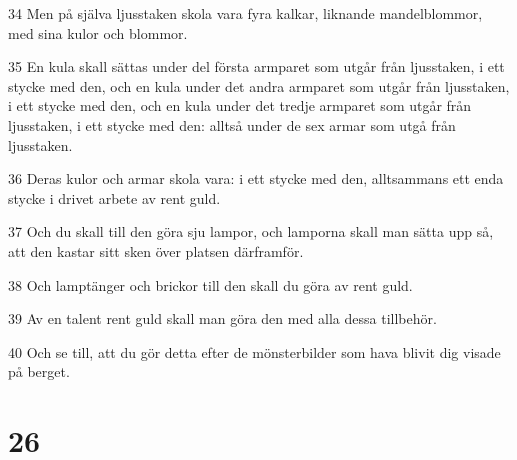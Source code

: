 \par 34 Men på själva ljusstaken skola vara fyra kalkar, liknande mandelblommor, med sina kulor och blommor.
\par 35 En kula skall sättas under del första armparet som utgår från ljusstaken, i ett stycke med den, och en kula under det andra armparet som utgår från ljusstaken, i ett stycke med den, och en kula under det tredje armparet som utgår från ljusstaken, i ett stycke med den: alltså under de sex armar som utgå från ljusstaken.
\par 36 Deras kulor och armar skola vara: i ett stycke med den, alltsammans ett enda stycke i drivet arbete av rent guld.
\par 37 Och du skall till den göra sju lampor, och lamporna skall man sätta upp så, att den kastar sitt sken över platsen därframför.
\par 38 Och lamptänger och brickor till den skall du göra av rent guld.
\par 39 Av en talent rent guld skall man göra den med alla dessa tillbehör.
\par 40 Och se till, att du gör detta efter de mönsterbilder som hava blivit dig visade på berget.

\chapter{26}

